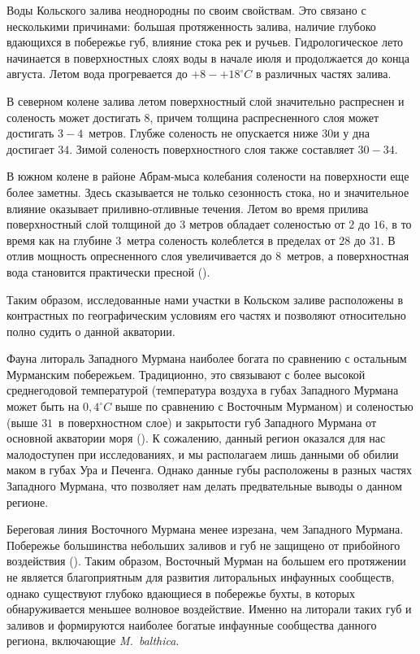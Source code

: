 Воды Кольского залива неоднородны по своим свойствам. 
Это связано с несколькими причинами: большая протяженность залива, наличие глубоко вдающихся в побережье губ, влияние стока рек и ручьев. 
Гидрологическое лето начинается в поверхностных слоях воды в начале июля и продолжается до конца августа. 
Летом вода прогревается до $+8 - +18^{\circ}C$ в различных частях залива.

В  северном колене залива летом поверхностный слой значительно распреснен и соленость может достигать $8$\permil, причем толщина распресненного слоя может достигать $3-4$~метров. 
Глубже соленость не опускается ниже $30$\permil и у дна достигает $34$\permil. 
Зимой соленость поверхностного слоя также составляет $30 - 34$\permil. 

В южном колене в районе Абрам-мыса колебания солености на поверхности еще более заметны. 
Здесь сказывается не только сезонность стока, но и значительное влияние оказывает приливно-отливные течения. 
Летом во время прилива поверхностный слой толщиной до 3 метров обладает соленостью от $2$ до $16$\permil, в то время как на глубине $3$~метра соленость колеблется в пределах от $28$ до $31$\permil. 
В отлив мощность опресненного слоя увеличивается до $8$~метров, а поверхностная вода становится практически пресной (\cite{Derugin_1915}).

Таким образом, исследованные нами участки в Кольском заливе расположены в контрастных по географическим условиям его частях и позволяют относительно полно судить о данной акватории.

Фауна литораль Западного Мурмана наиболее богата по сравнению с остальным Мурманским побережьем. 
Традиционно, это связывают с более высокой среднегодовой температурой (температура воздуха в губах Западного Мурмана может быть на $0,4^{\circ}C$ выше по сравнению с Восточным Мурманом) и соленостью (выше $31$\permil\ в поверхностном слое) и закрытости губ Западного Мурмана от основной акватории моря (\cite{Guryanova_et_al_1930}). 
К сожалению, данный регион оказался для нас малодоступен при исследованиях, и мы располагаем лишь данными об обилии маком в губах Ура и Печенга.
Однако данные губы расположены в разных частях Западного Мурмана, что позволяет нам делать предвательные выводы о данном регионе.

Береговая линия Восточного Мурмана менее изрезана, чем Западного Мурмана. 
Побережье большинства небольших заливов и губ не защищено от прибойного воздействия (\cite{Guryanova_Ushakov_1929}).
Таким образом, Восточный Мурман на большем его протяжении не является благоприятным для развития литоральных инфаунных сообществ, однако существуют глубоко вдающиеся в побережье бухты, в которых обнаруживается меньшее волновое воздействие. 
Именно на литорали таких губ и заливов и формируются наиболее богатые инфаунные сообщества данного региона, включающие {\it M.~balthica}.

